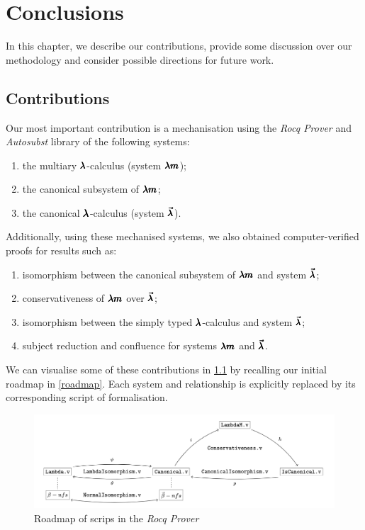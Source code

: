 \chapter{Conclusions}
\label{c:conclusions}

In this chapter, we describe our contributions, provide some discussion over our methodology and consider possible directions for future work.

\section{Contributions}


Our most important contribution is a mechanisation using the \textit{Rocq Prover} and \textit{Autosubst} library of the following systems:
\begin{enumerate}
\item the multiary $\pmb{\lambda}$-calculus (system $\pmb{\lambda m}$);
\item the canonical subsystem of $\pmb{\lambda m}$;
\item the canonical $\pmb{\lambda}$-calculus (system $\pmb{\vec \lambda}$).
\end{enumerate}


Additionally, using these mechanised systems, we also obtained computer-verified proofs for results such as:
\begin{enumerate}
\item isomorphism between the canonical subsystem of $\pmb{\lambda m}$ and system $\pmb{\vec \lambda}$;
\item conservativeness of $\pmb{\lambda m}$ over $\pmb{\vec \lambda}$;
\item isomorphism between the simply typed $\pmb{\lambda}$-calculus and system $\pmb{\vec \lambda}$;
\item subject reduction and confluence for systems $\pmb{\lambda m}$ and $\pmb{\vec \lambda}$.
\end{enumerate}

We can visualise some of these contributions in \cref{scripts_roadmap} by recalling our initial roadmap in \cref{roadmap}.
Each system and relationship is explicitly replaced by its corresponding script of formalisation.

\begin{figure}[h]
  \centering
  \includegraphics[width=1\textwidth]{pictures/scripts_roadmap}
  \caption{Roadmap of scrips in the \textit{Rocq Prover}} \label{scripts_roadmap}
\end{figure}

